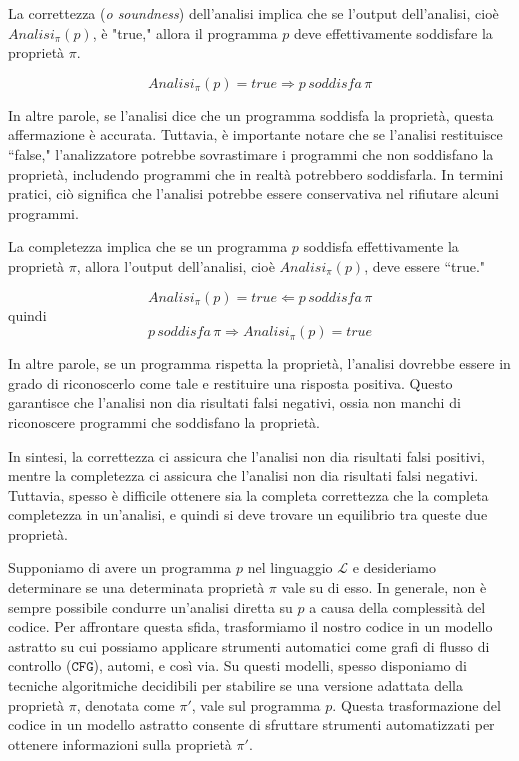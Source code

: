 \begin{tcolorbox}[title =Soundness (\textit{Correttezza})]
La correttezza (\textit{o soundness}) dell'analisi implica che se l'output dell'analisi,
cioè $Analisi_{\pi}(p)$, è "true," allora il programma $p$ deve effettivamente soddisfare la
proprietà $\pi$.

\[ Analisi_{\pi}(p) = true \Rightarrow p \,\textit{soddisfa} \,\pi \]
\end{tcolorbox}
In altre parole, se l'analisi dice che un programma soddisfa la proprietà,
questa affermazione è accurata. Tuttavia, è importante notare che se l'analisi restituisce ``false,"
l'analizzatore potrebbe sovrastimare i programmi che non soddisfano la proprietà, includendo programmi
che in realtà potrebbero soddisfarla. In termini pratici, ciò significa che l'analisi potrebbe essere
conservativa nel rifiutare alcuni programmi.

\begin{tcolorbox}[title={Completezza}]
La completezza implica che se un programma $p$ soddisfa effettivamente la proprietà $\pi$,
allora l'output dell'analisi, cioè $Analisi_{\pi}(p)$, deve essere ``true."

\[ Analisi_{\pi}(p) = true \Leftarrow p \,\textit{soddisfa} \,\pi \]
quindi
\[ p \,\textit{soddisfa} \,\pi \Rightarrow Analisi_{\pi}(p) = true \]
\end{tcolorbox}
In altre parole, se un programma rispetta la proprietà, l'analisi dovrebbe essere in grado di riconoscerlo come
tale e restituire una risposta positiva. Questo garantisce che l'analisi non dia risultati
falsi negativi, ossia non manchi di riconoscere programmi che soddisfano la proprietà.

In sintesi, la correttezza ci assicura che l'analisi non dia risultati falsi positivi,
mentre la completezza ci assicura che l'analisi non dia risultati falsi negativi. Tuttavia,
spesso è difficile ottenere sia la completa correttezza che la completa completezza in un'analisi,
e quindi si deve trovare un equilibrio tra queste due proprietà.

Supponiamo di avere un programma $p$ nel linguaggio $\mathcal{L}$ e desideriamo
determinare se una determinata proprietà $\pi$ vale su di esso. In generale, non
è sempre possibile condurre un'analisi diretta su $p$ a causa della complessità del
codice. Per affrontare questa sfida, trasformiamo il nostro codice in un modello astratto
su cui possiamo applicare strumenti automatici come grafi di flusso di controllo ($\texttt{CFG}$),
automi, e così via. Su questi modelli, spesso disponiamo di tecniche algoritmiche decidibili per
stabilire se una versione adattata della proprietà $\pi$, denotata come $\pi'$, vale sul programma $p$.
Questa trasformazione del codice in un modello astratto consente di sfruttare
strumenti automatizzati per ottenere informazioni sulla proprietà $\pi'$.

